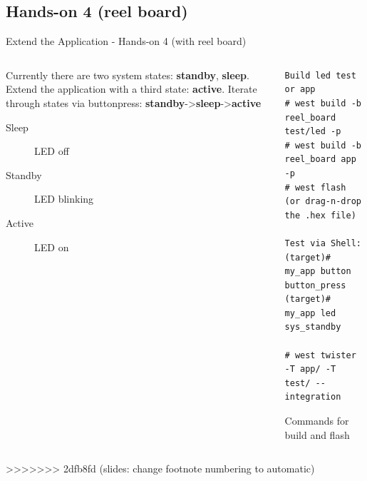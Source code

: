 \documentclass[10pt, aspectratio=169]{beamer}
\begin{document}
\subsection{Hands-on 4 (reel board)}
\begin{frame}[fragile]{Extend the Application - Hands-on 4 (with reel board)}
  \begin{columns}
    \begin{column}{0.6\textwidth}
      Currently there are two system states: \textbf{standby}, \textbf{sleep}.
      Extend the application with a third state: \textbf{active}. Iterate
      through states via buttonpress:
      \textbf{standby}->\textbf{sleep}->\textbf{active}\footnotemark[1]
      \begin{description}
        \item [Sleep] LED off
        \item [Standby] LED blinking
        \item [Active] LED on
      \end{description}
    \end{column}
    \begin{column}{0.4\textwidth}
      \begin{listing}[H]
        \begin{verbatim}
Build led test or app
# west build -b reel_board test/led -p
# west build -b reel_board app -p
# west flash (or drag-n-drop the .hex file)

Test via Shell:
(target)# my_app button button_press
(target)# my_app led sys_standby

# west twister -T app/ -T test/ --integration

        \end{verbatim}
        \caption{\footnotesize{Commands for build and flash}}
      \end{listing}
    \end{column}
  \end{columns}
\end{frame}
>>>>>>> 2dfb8fd (slides: change footnote numbering to automatic)
\end{document}
